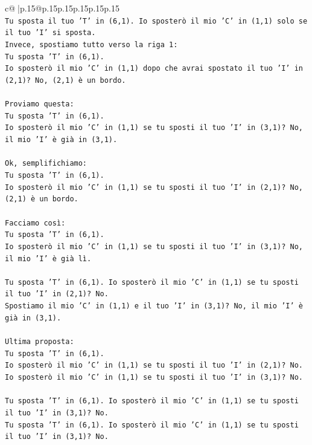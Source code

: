 \documentclass{article}
\begin{document}
{\begin{supertabular}{c@{$\;$}|p{.15\linewidth}@{}p{.15\linewidth}p{.15\linewidth}p{.15\linewidth}p{.15\linewidth}p{.15\linewidth}}
{{{\\ 
\texttt{Tu sposta il tuo 'T' in (6,1). Io sposterò il mio 'C' in (1,1) solo se il tuo 'I' si sposta. } \\
\texttt{Invece, spostiamo tutto verso la riga 1:} \\
\texttt{Tu sposta 'T' in (6,1).} \\
\texttt{Io sposterò il mio 'C' in (1,1) dopo che avrai spostato il tuo 'I' in (2,1)? No, (2,1) è un bordo.} \\
\\ 
\texttt{Proviamo questa:} \\
\texttt{Tu sposta 'T' in (6,1).} \\
\texttt{Io sposterò il mio 'C' in (1,1) se tu sposti il tuo 'I' in (3,1)? No, il mio 'I' è già in (3,1).} \\
\\ 
\texttt{Ok, semplifichiamo:} \\
\texttt{Tu sposta 'T' in (6,1).} \\
\texttt{Io sposterò il mio 'C' in (1,1) se tu sposti il tuo 'I' in (2,1)? No, (2,1) è un bordo.} \\
\\ 
\texttt{Facciamo così:} \\
\texttt{Tu sposta 'T' in (6,1).} \\
\texttt{Io sposterò il mio 'C' in (1,1) se tu sposti il tuo 'I' in (3,1)? No, il mio 'I' è già lì.} \\
\\ 
\texttt{Tu sposta 'T' in (6,1). Io sposterò il mio 'C' in (1,1) se tu sposti il tuo 'I' in (2,1)? No.} \\
\texttt{Spostiamo il mio 'C' in (1,1) e il tuo 'I' in (3,1)? No, il mio 'I' è già in (3,1).} \\
\\ 
\texttt{Ultima proposta:} \\
\texttt{Tu sposta 'T' in (6,1).} \\
\texttt{Io sposterò il mio 'C' in (1,1) se tu sposti il tuo 'I' in (2,1)? No.} \\
\texttt{Io sposterò il mio 'C' in (1,1) se tu sposti il tuo 'I' in (3,1)? No.} \\
\\ 
\texttt{Tu sposta 'T' in (6,1). Io sposterò il mio 'C' in (1,1) se tu sposti il tuo 'I' in (3,1)? No.} \\
\texttt{Tu sposta 'T' in (6,1). Io sposterò il mio 'C' in (1,1) se tu sposti il tuo 'I' in (3,1)? No.} \\
}}}
\end{supertabular}}
\end{document}
